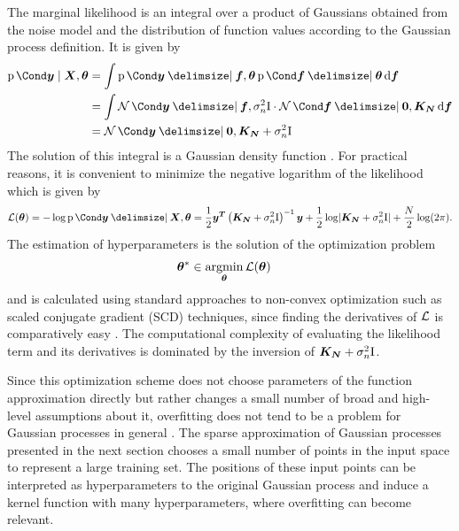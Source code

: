 The marginal likelihood is an integral over a product of Gaussians obtained from the noise model and the distribution of function values according to the Gaussian process definition.
It is given by
\begin{align}
    \Prob{\mat{y} \mid \mat{X}, \mat{\theta}} &= \int \Prob{\mat{y} \given \mat{f}, \mat{\theta}} \Prob{\mat{f} \given \mat{\theta}} \diff \mat{f} \label{eq:gp_f_marginalization} \\
    &= \int \Gaussian{\mat{y} \given \mat{f}, \sigma_n^2 \Eye} \cdot \Gaussian{\mat{f} \given \mat{0}, \mat{K_N}} \diff \mat{f} \\
    &= \Gaussian{\mat{y} \given \mat{0}, \mat{K_N} + \sigma_n^2 \Eye}
\end{align}
The solution of this integral is a Gaussian density function \cite{petersen_matrix_2008}.
For practical reasons, it is convenient to minimize the negative logarithm of the likelihood which is given by
\begin{align}
    \Ell(\mat{\theta}) = -\log\Prob{\mat{y} \given \mat{X}, \mat{\theta}} =
    \frac{1}{2} \mat{y^T} \left( \mat{K_N} + \sigma_n^2 \Eye \right)^{-1} \mat{y} +
    \frac{1}{2} \log \abs{\mat{K_N} + \sigma_n^2 \Eye} +
    \frac{N}{2} \log(2\pi).
\end{align}
The estimation of hyperparameters is the solution of the optimization problem
\begin{align}
    \bm{\theta}^\ast &\in \operatorname*{argmin}_{\bm{\theta}} \operatorname{\mathcal{L}}(\bm{\theta})
\end{align}
and is calculated using standard approaches to non-convex optimization such as scaled conjugate gradient (SCD) techniques, since finding the derivatives of $\operatorname{\mathcal{L}}$ is comparatively easy \cite{rasmussen_gaussian_2006}.
The computational complexity of evaluating the likelihood term and its derivatives is dominated by the inversion of $\bm{K_N} + \sigma_n^2 \mathrm{I}$.

Since this optimization scheme does not choose parameters of the function approximation directly but rather changes a small number of broad and high-level assumptions about it, overfitting does not tend to be a problem for Gaussian processes in general \cite{snelson_flexible_2007}.
The sparse approximation of Gaussian processes presented in the next section chooses a small number of points in the input space to represent a large training set.
The positions of these input points can be interpreted as hyperparameters to the original Gaussian process and induce a kernel function with many hyperparameters, where overfitting can become relevant.

